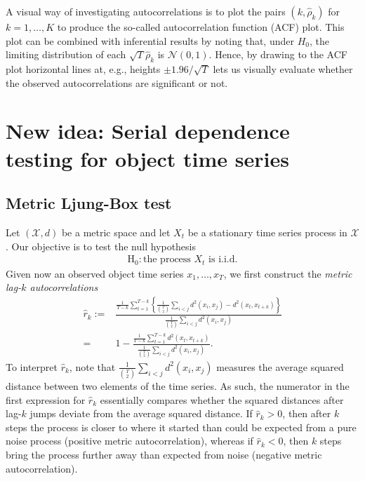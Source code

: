 \documentclass{article}
\begin{document}
A visual way of investigating autocorrelations is to plot the pairs $(k, \hat{\rho}_k)$ for $k = 1, \ldots, K$ to produce the so-called autocorrelation function (ACF) plot. This plot can be combined with inferential results by noting that, under $H_{0}$, the limiting distribution of each $\sqrt{T}\hat{\rho}_k$ is $\mathcal{N}(0, 1)$. Hence, by drawing to the ACF plot  horizontal lines at, e.g., heights $\pm 1.96/\sqrt{T} $ lets us visually evaluate whether the observed autocorrelations are significant or not.

\section{New idea: Serial dependence testing for object time series}

\subsection{Metric Ljung-Box test}

Let $(\mathcal{X}, d)$ be a metric space and let $X_t$ be a stationary time series process in $\mathcal{X}$. Our objective is to test the null hypothesis
\begin{align*}
    \mathrm{H_{0}}: \mbox{the process $X_t$ is i.i.d.} 
\end{align*}
Given now an observed object time series $x_1, \ldots, x_T$, we first construct the \textit{metric lag-$k$ autocorrelations}
{\large
\begin{align*}
    \hat{r}_k :=& \frac{\frac{1}{T - k} \sum_{t = 1}^{T - k} \left\{ \frac{1}{\binom{T}{2}} \sum_{i < j} d^2(x_i, x_j) -  d^2(x_t, x_{t + k}) \right\}}{\frac{1}{\binom{T}{2}} \sum_{i < j} d^2(x_i, x_j)} \\
    =& 1 - \frac{\frac{1}{T - k} \sum_{t = 1}^{T - k} d^2(x_t, x_{t + k})}{\frac{1}{\binom{T}{2}} \sum_{i < j} d^2(x_i, x_j)}.
\end{align*}
}
To interpret $\hat{r}_k$, note that $\frac{1}{\binom{T}{2}} \sum_{i < j} d^2(x_i, x_j)$ measures the average squared distance between two elements of the time series. As such, the numerator in the first expression for $\hat{r}_k$ essentially compares whether the squared distances after lag-$k$ jumps deviate from the average squared distance. If $\hat{r}_k > 0$, then after $k$ steps the process is closer to where it started than could be expected from a pure noise process (positive metric autocorrelation), whereas if $\hat{r}_k < 0$, then $k$ steps bring the process further away than expected from noise (negative metric autocorrelation).
\end{document}
